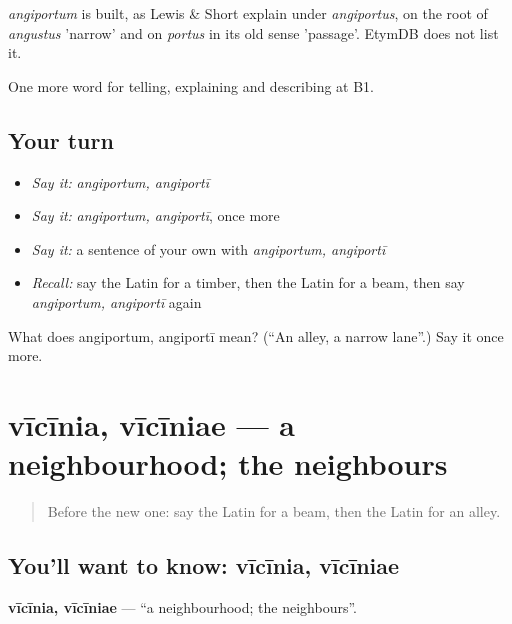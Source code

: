 \begin{cousinweb}
\emph{angiportum} is built, as Lewis \& Short explain under \emph{angiportus}, on the root of \emph{angustus} 'narrow' and on \emph{portus} in its old sense 'passage'. EtymDB does not list it.
\end{cousinweb}

\begin{grammarlens}[title={What you've built}]
One more word for telling, explaining and describing at B1.
\end{grammarlens}

\subsection*{Your turn}
\begin{itemize}
\raggedright
  \item \emph{Say it:} \emph{angiportum, angiportī}
  \item \emph{Say it:} \emph{angiportum, angiportī}, once more
  \item \emph{Say it:} a sentence of your own with \emph{angiportum, angiportī}
  \item \emph{Recall:} say the Latin for a timber, then the Latin for a beam, then say \emph{angiportum, angiportī} again
\end{itemize}

\begin{tcolorbox}[breakable,colback=teal!4,colframe=teal!35!black,title={Before you move on}]
What does angiportum, angiportī mean? (\textquotedblleft{}An alley, a narrow lane\textquotedblright{}.) Say it once more.
\end{tcolorbox}
\section[vīcīnia, vīcīniae]{vīcīnia, vīcīniae — a neighbourhood; the neighbours}

\label{lesson:LA-C458-vicinia}



\begin{quote}
Before the new one: say the Latin for a beam, then the Latin for an alley.
\end{quote}

\subsection*{You'll want to know: vīcīnia, vīcīniae}
\textbf{vīcīnia, vīcīniae} — \textquotedblleft{}a neighbourhood; the neighbours\textquotedblright{}.

